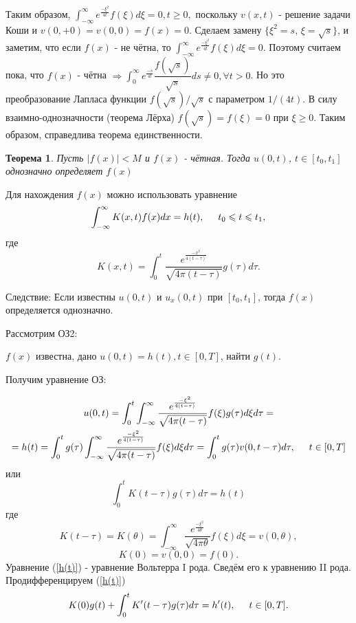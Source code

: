 \documentclass{article}
\newtheorem{theorem}{Теорема}
\begin{document}
Таким образом, 
$
\int_{-\infty}^{\infty} e^{\frac{-\xi^2}{4t}} f(\xi) d\xi = 0, t \geqslant 0,
$
поскольку $v(x,t)$ - решение задачи Коши и $v(0, +0) = v(0,0) = f(x) = 0$.
Сделаем замену $\{ \xi^2 = s$, $\xi = \sqrt{s} \}$, и заметим, что если $f(x)$ - не чётна, то $
\int_{-\infty}^{\infty} e^{\frac{-\xi^2}{4t}} f(\xi) d\xi = 0
$.
Поэтому считаем пока, что $f(x)$ - чётна 
$
\Rightarrow \int_0^{\infty} e^{\frac{-s}{4t}} \dfrac{f(\sqrt{s})}{\sqrt{s}} d s \neq 0, \forall t > 0
$.
Но это преобразование Лапласа функции $f(\sqrt{s}) / \sqrt{s}$ с параметром $1 / (4t)$. В силу взаимно-однозначности (теорема Лёрха) $f(\sqrt{s})  = f(\xi) = 0$ при $\xi \geqslant 0$.
Таким образом, справедлива теорема единственности.

\begin{theorem}
Пусть $|f(x)| < M$ и $f(x)$ - чётная. Тогда $u(0,t)$, $t \in[t_0,t_1]$ однозначно определяет $f(x)$
\end{theorem}

Для нахождения $f(x)$ можно использовать уравнение 
\[
\int_{-\infty}^{\infty} K(x,t) f(x) dx = h(t),
\hspace{0.5cm} t_0 \leqslant t \leqslant t_1,
\]
где 
\[
K(x,t) = \int_0^t \dfrac{e^{\frac{-x^2}{4 (t-\tau)}}}{\sqrt{4 \pi (t -\tau)}}  g(\tau) d \tau.
\]

Следствие: Если известны $u(0,t)$ и $u_x(0,t)$  при $[t_0,t_1]$, тогда $f(x)$ определяется однозначно.

\vspace{0.2cm}

Рассмотрим ОЗ2:

$f(x)$ известна, дано $u(0,t) = h(t), t\in [0,T]$,  найти $g(t)$.

Получим уравнение ОЗ:

\begin{multline*}
u(0,t) = \int_0^t \int_{-\infty}^{\infty} \dfrac{e^{\frac{-\xi^2}{4 (t-\tau)}}}{\sqrt{4 \pi (t -\tau)}} f(\xi) g(\tau) d \xi d \tau = \\
= h(t) = 
\int_0^t g(\tau) \int_{-\infty}^{\infty} \dfrac{e^{\frac{-\xi^2}{4 (t-\tau)}}}{\sqrt{4 \pi (t -\tau)}} f(\xi)  d \xi d \tau =
\int_0^t g(\tau) v(0,t-\tau) d \tau
, \hspace{0.5cm} t \in[0,T]
\end{multline*}
или
\begin{equation}
\int_0^t K(t-\tau) g(\tau) d \tau = h(t)
\label{h(t)}
\end{equation}
где
\begin{equation}
K(t-\tau	) = K(\theta) = 
\int_{-\infty}^{\infty} \dfrac{e^{\frac{-\xi^2}{4 \theta}}}{\sqrt{4 \pi \theta}}  f(\xi) d \xi = v(0,\theta),
\label{K(theta)}
\end{equation}
\[
K(0) = v(0,0) = f(0).
\]
Уравнение (\ref{h(t)}) - уравнение Вольтерра I рода. Сведём его к уравнению II рода. Продифференцируем (\ref{h(t)})
\begin{equation}
K(0) g(t) + \int_0^t K'(t-\tau) g(\tau) d \tau = h'(t), 
\hspace{0.5cm} t \in [0,T].
\label{K(0) g(t)}
\end{equation}
\end{document}
